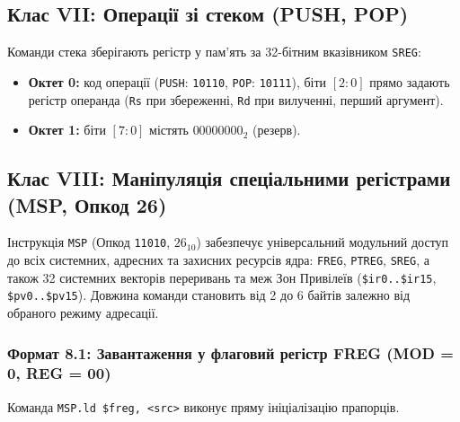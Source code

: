 \documentclass[11pt,a4paper]{article}
\newcommand{\reg}[1]{\texttt{#1}}
\newcommand{\bits}[1]{\texttt{#1}}
\begin{document}
\subsection{Клас VII: Операції зі стеком (PUSH, POP)}
Команди стека зберігають регістр у пам'ять за 32-бітним вказівником \reg{SREG}:
\begin{itemize}
  \item \textbf{Октет 0:} код операції (\texttt{PUSH}: \bits{10110}, \texttt{POP}: \bits{10111}), біти $[2:0]$ прямо задають регістр операнда (\reg{Rs} при збереженні, \reg{Rd} при вилученні, перший аргумент).
  \item \textbf{Октет 1:} біти $[7:0]$ містять $00000000_2$ (резерв).
\end{itemize}

\subsection{Клас VIII: Маніпуляція спеціальними регістрами (MSP, Опкод 26)}
Інструкція \texttt{MSP} (Опкод \bits{11010}, $26_{10}$) забезпечує універсальний модульний доступ до всіх системних, адресних та захисних ресурсів ядра: \reg{FREG}, \reg{PTREG}, \reg{SREG}, а також 32 системних векторів переривань та меж Зон Привілеїв (\texttt{\$ir0..\$ir15}, \texttt{\$pv0..\$pv15}). Довжина команди становить від 2 до 6 байтів залежно від обраного режиму адресації.

\subsubsection{Формат 8.1: Завантаження у флаговий регістр FREG (MOD = 0, REG = 00)}
Команда \texttt{MSP.ld \$freg, <src>} виконує пряму ініціалізацію прапорців.
\end{document}
